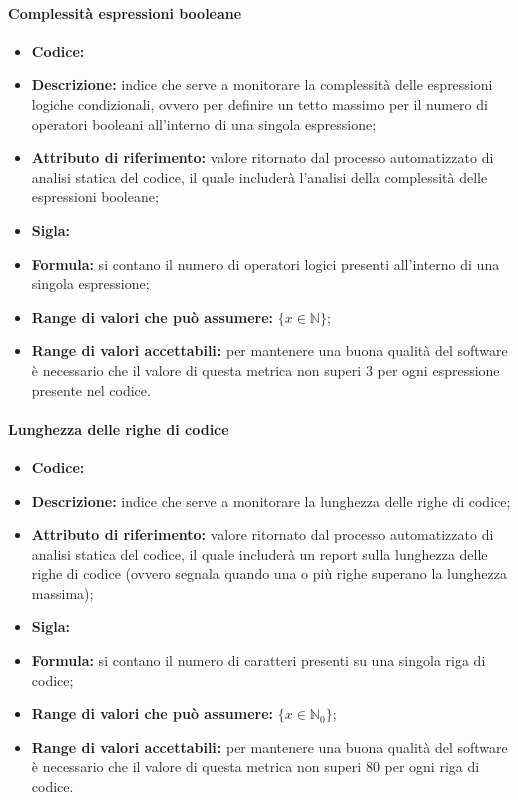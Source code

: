 \paragraph{Complessità espressioni booleane}
\begin{itemize}
    \item \textbf{Codice:}
    \item \textbf{Descrizione:} indice che serve a monitorare la complessità delle espressioni logiche condizionali, ovvero per definire un tetto massimo per il
                                numero di operatori booleani all'interno di una singola espressione;
    \item \textbf{Attributo di riferimento:} valore ritornato dal processo automatizzato di analisi statica del codice, il quale includerà l'analisi della complessità delle espressioni booleane;
    \item \textbf{Sigla:}
    \item \textbf{Formula:} si contano il numero di operatori logici presenti all'interno di una singola espressione;
    \item \textbf{Range di valori che può assumere:} $\{x \in \mathbb{N} \}$;
    \item \textbf{Range di valori accettabili:} per mantenere una buona qualità del software è necessario che il valore di questa metrica non superi
    3 per ogni espressione presente nel codice.
\end{itemize}

\paragraph{Lunghezza delle righe di codice}
\begin{itemize}
    \item \textbf{Codice:}
    \item \textbf{Descrizione:} indice che serve a monitorare la lunghezza delle righe di codice;
    \item \textbf{Attributo di riferimento:} valore ritornato dal processo automatizzato di analisi statica del codice, il quale includerà un report sulla lunghezza delle righe di codice
                                            (ovvero segnala quando una o più righe superano la lunghezza massima);
    \item \textbf{Sigla:}
    \item \textbf{Formula:} si contano il numero di caratteri presenti su una singola riga di codice;
    \item \textbf{Range di valori che può assumere:} $\{x \in \mathbb{N}_0 \}$;
    \item \textbf{Range di valori accettabili:} per mantenere una buona qualità del software è necessario che il valore di questa metrica non superi
    80 per ogni riga di codice.
\end{itemize}



